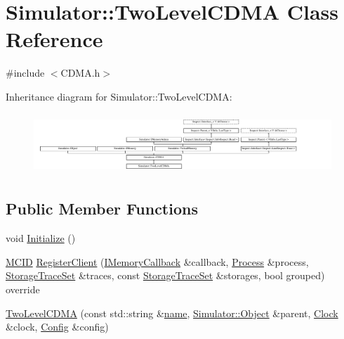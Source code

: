 \hypertarget{class_simulator_1_1_two_level_c_d_m_a}{\section{Simulator\+:\+:Two\+Level\+C\+D\+M\+A Class Reference}
\label{class_simulator_1_1_two_level_c_d_m_a}
}


{\ttfamily \#include $<$C\+D\+M\+A.\+h$>$}

Inheritance diagram for Simulator\+:\+:Two\+Level\+C\+D\+M\+A\+:\begin{figure}[H]
\begin{center}
\leavevmode
\includegraphics[height=2.301370cm]{class_simulator_1_1_two_level_c_d_m_a}
\end{center}
\end{figure}
\subsection*{Public Member Functions}
\begin{DoxyCompactItemize}
\item 
void \hyperlink{class_simulator_1_1_two_level_c_d_m_a_a5954b293aa52a9603bba29bad31cebb5}{Initialize} ()
\item 
\hyperlink{namespace_simulator_a4b5747ff30c62c6373badf3b53b9abf7}{M\+C\+I\+D} \hyperlink{class_simulator_1_1_two_level_c_d_m_a_a254abde493b1ddbdad324f52dff1aa7a}{Register\+Client} (\hyperlink{class_simulator_1_1_i_memory_callback}{I\+Memory\+Callback} \&callback, \hyperlink{class_simulator_1_1_process}{Process} \&process, \hyperlink{class_simulator_1_1_storage_trace_set}{Storage\+Trace\+Set} \&traces, const \hyperlink{class_simulator_1_1_storage_trace_set}{Storage\+Trace\+Set} \&storages, bool grouped) override
\item 
\hyperlink{class_simulator_1_1_two_level_c_d_m_a_a6119d0a0648867bbf1c4fbdae5c85246}{Two\+Level\+C\+D\+M\+A} (const std\+::string \&\hyperlink{mtconf_8c_a8f8f80d37794cde9472343e4487ba3eb}{name}, \hyperlink{class_simulator_1_1_object}{Simulator\+::\+Object} \&parent, \hyperlink{class_simulator_1_1_clock}{Clock} \&clock, \hyperlink{class_config}{Config} \&config)
\end{DoxyCompactItemize}
